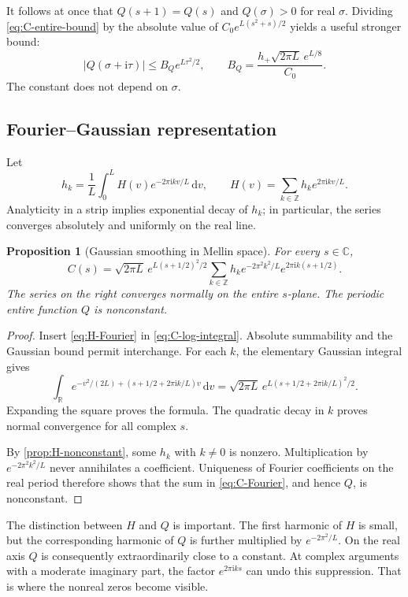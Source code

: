 \documentclass[11pt,a4paper]{article}
\numberwithin{equation}{section}
\newtheorem{proposition}[proposition]{Proposition}
\theoremstyle{definition}
\theoremstyle{remark}
\newcommand{\R}{\mathbb R}
\newcommand{\C}{\mathbb C}
\newcommand{\Z}{\mathbb Z}
\newcommand{\ii}{\mathrm i}
\newcommand{\dd}{\,\mathrm d}
\newcommand{\abs}[1]{\left|#1\right|}
\begin{document}
It follows at once that $Q(s+1)=Q(s)$ and $Q(\sigma)>0$ for real
$\sigma$. Dividing \cref{eq:C-entire-bound} by the absolute value of
$C_0e^{L(s^2+s)/2}$ yields a useful stronger bound:
\begin{equation}
 \abs{Q(\sigma+\ii\tau)}\le B_Qe^{L\tau^2/2},
 \qquad
 B_Q=\frac{h_+\sqrt{2\pi L}\,e^{L/8}}{C_0}.
 \label{eq:Q-growth}
\end{equation}
The constant does not depend on $\sigma$.

\subsection{Fourier--Gaussian representation}
Let
\begin{equation}
 h_k=\frac1L\int_0^L H(v)e^{-2\pi\ii kv/L}\dd v,
 \qquad H(v)=\sum_{k\in\Z}h_ke^{2\pi\ii kv/L}.
 \label{eq:H-Fourier}
\end{equation}
Analyticity in a strip implies exponential decay of $h_k$; in
particular, the series converges absolutely and uniformly on the
real line.

\begin{proposition}[Gaussian smoothing in Mellin space]
\label{prop:C-Fourier}
For every $s\in\C$,
\begin{equation}
 C(s)=\sqrt{2\pi L}\,e^{L(s+1/2)^2/2}
 \sum_{k\in\Z}h_k e^{-2\pi^2k^2/L}
             e^{2\pi\ii k(s+1/2)}.
 \label{eq:C-Fourier}
\end{equation}
The series on the right converges normally on the entire $s$-plane.
The periodic entire function $Q$ is nonconstant.
\end{proposition}
\begin{proof}
Insert \cref{eq:H-Fourier} in \cref{eq:C-log-integral}. Absolute
summability and the Gaussian bound permit interchange. For each
$k$, the elementary Gaussian integral gives
\[
 \int_{\R}e^{-v^2/(2L)+(s+1/2+2\pi\ii k/L)v}\dd v
 =\sqrt{2\pi L}\,
  e^{L(s+1/2+2\pi\ii k/L)^2/2}.
\]
Expanding the square proves the formula. The quadratic decay in $k$
proves normal convergence for all complex $s$.

By \cref{prop:H-nonconstant}, some $h_k$ with $k\ne0$ is nonzero.
Multiplication by $e^{-2\pi^2k^2/L}$ never annihilates a coefficient.
Uniqueness of Fourier coefficients on the real period therefore
shows that the sum in \cref{eq:C-Fourier}, and hence $Q$, is
nonconstant.
\end{proof}

The distinction between $H$ and $Q$ is important. The first harmonic
of $H$ is small, but the corresponding harmonic of $Q$ is further
multiplied by $e^{-2\pi^2/L}$. On the real axis $Q$ is consequently
extraordinarily close to a constant. At complex arguments with a
moderate imaginary part, the factor $e^{2\pi\ii ks}$ can undo this
suppression. That is where the nonreal zeros become visible.
\end{document}
